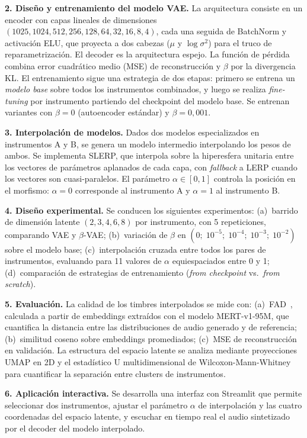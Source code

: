 \documentclass[a4paper,11pt,titlepage]{article}
\begin{document}
\textbf{2. Diseño y entrenamiento del modelo VAE.}
La arquitectura consiste en un encoder con capas lineales de dimensiones
$(1025, 1024, 512, 256, 128, 64, 32, 16, 8, 4)$, cada una seguida de BatchNorm y
activación ELU, que proyecta a dos cabezas ($\mu$ y $\log\sigma^2$) para el truco de
reparametrización. El decoder es la arquitectura espejo. La función de pérdida combina
error cuadrático medio (MSE) de reconstrucción y $\beta$ por la divergencia KL.
El entrenamiento sigue una estrategia de dos etapas: primero se entrena un \emph{modelo base}
sobre todos los instrumentos combinados, y luego se realiza \emph{fine-tuning} por
instrumento partiendo del checkpoint del modelo base. Se entrenan variantes con
$\beta = 0$ (autoencoder estándar) y $\beta = 0{,}001$.

\textbf{3. Interpolación de modelos.}
Dados dos modelos especializados en instrumentos A y B, se genera un modelo intermedio
interpolando los pesos de ambos. Se implementa SLERP, que interpola sobre la
hiperesfera unitaria entre los vectores de parámetros aplanados de cada capa,
con \emph{fallback} a LERP cuando los vectores son cuasi-paralelos. El parámetro
$\alpha \in [0, 1]$ controla la posición en el morfismo: $\alpha = 0$ corresponde
al instrumento A y $\alpha = 1$ al instrumento B.

\textbf{4. Diseño experimental.}
Se conducen los siguientes experimentos: (a)~barrido de dimensión latente
$(2, 3, 4, 6, 8)$ por instrumento, con 5 repeticiones, comparando VAE y $\beta$-VAE;
(b)~variación de $\beta$ en $(0;\; 10^{-5};\; 10^{-4};\; 10^{-3};\; 10^{-2})$ sobre
el modelo base; (c)~interpolación cruzada entre todos los pares de instrumentos,
evaluando para 11 valores de $\alpha$ equiespaciados entre 0 y 1;
(d)~comparación de estrategias de entrenamiento (\emph{from checkpoint} vs.\
\emph{from scratch}).

\textbf{5. Evaluación.}
La calidad de los timbres interpolados se mide con: (a)~FAD~\cite{gui2024adaptingfrechetaudiodistance}, calculada a partir de
embeddings extraídos con el modelo MERT-v1-95M, que cuantifica la distancia entre las
distribuciones de audio generado y de referencia; (b)~similitud coseno sobre embeddings
promediados; (c)~MSE de reconstrucción en validación. La estructura del espacio latente
se analiza mediante proyecciones UMAP en 2D y el estadístico U multidimensional de
Wilcoxon-Mann-Whitney para cuantificar la separación entre clusters de instrumentos.

\textbf{6. Aplicación interactiva.}
Se desarrolla una interfaz con Streamlit que permite seleccionar dos instrumentos,
ajustar el parámetro $\alpha$ de interpolación y las cuatro coordenadas del espacio
latente, y escuchar en tiempo real el audio sintetizado por el decoder del modelo
interpolado.
\end{document}
